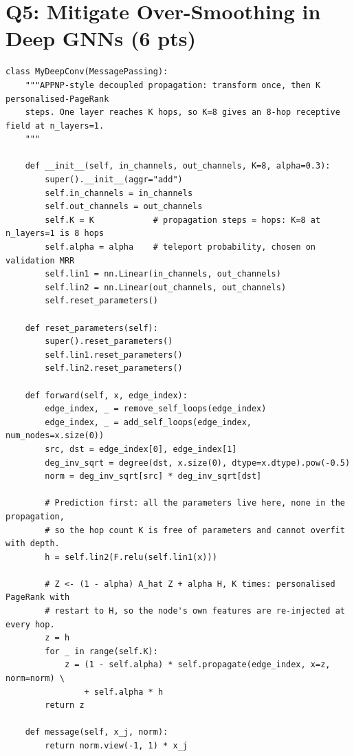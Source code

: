 \section*{Q5: Mitigate Over-Smoothing in Deep GNNs (6 pts)}

\begin{lstlisting}[style=p1pystyle]
class MyDeepConv(MessagePassing):
    """APPNP-style decoupled propagation: transform once, then K personalised-PageRank
    steps. One layer reaches K hops, so K=8 gives an 8-hop receptive field at n_layers=1.
    """

    def __init__(self, in_channels, out_channels, K=8, alpha=0.3):
        super().__init__(aggr="add")
        self.in_channels = in_channels
        self.out_channels = out_channels
        self.K = K            # propagation steps = hops: K=8 at n_layers=1 is 8 hops
        self.alpha = alpha    # teleport probability, chosen on validation MRR
        self.lin1 = nn.Linear(in_channels, out_channels)
        self.lin2 = nn.Linear(out_channels, out_channels)
        self.reset_parameters()

    def reset_parameters(self):
        super().reset_parameters()
        self.lin1.reset_parameters()
        self.lin2.reset_parameters()

    def forward(self, x, edge_index):
        edge_index, _ = remove_self_loops(edge_index)
        edge_index, _ = add_self_loops(edge_index, num_nodes=x.size(0))
        src, dst = edge_index[0], edge_index[1]
        deg_inv_sqrt = degree(dst, x.size(0), dtype=x.dtype).pow(-0.5)
        norm = deg_inv_sqrt[src] * deg_inv_sqrt[dst]

        # Prediction first: all the parameters live here, none in the propagation,
        # so the hop count K is free of parameters and cannot overfit with depth.
        h = self.lin2(F.relu(self.lin1(x)))

        # Z <- (1 - alpha) A_hat Z + alpha H, K times: personalised PageRank with
        # restart to H, so the node's own features are re-injected at every hop.
        z = h
        for _ in range(self.K):
            z = (1 - self.alpha) * self.propagate(edge_index, x=z, norm=norm) \
                + self.alpha * h
        return z

    def message(self, x_j, norm):
        return norm.view(-1, 1) * x_j
\end{lstlisting}

